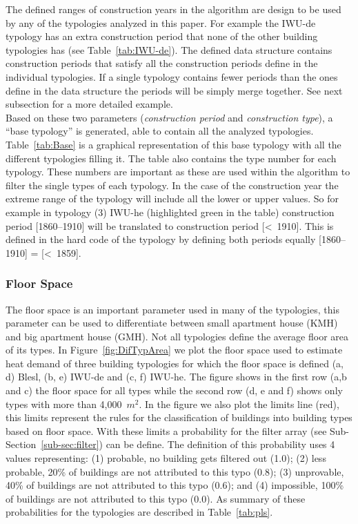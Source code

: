 \documentclass[authoryear,preprint,review,12pt]{elsarticle}
\begin{document}
\begin{linenumbers}
The defined ranges of construction years in the algorithm are design to be used
by any of the typologies analyzed in this paper.  For example the IWU-de
typology has an extra construction period that none of the other building
typologies has (see Table~\ref{tab:IWU-de}). The defined data structure
contains construction periods that satisfy all the construction periods define
in the individual typologies. If a single typology contains fewer periods than
the ones define in the data structure the periods will be simply merge
together. See next subsection for a more detailed example.\\

Based on these two parameters (\textit{construction period} and
\textit{construction type}), a ``base typology'' is generated, able to contain
all the analyzed typologies. Table~\ref{tab:Base} is a graphical
representation of this base typology with all the different typologies filling
it. The table also contains the type number for each typology. These numbers
are important as these are used within the algorithm to filter the single types
of each typology. In the case of the construction year the extreme range of
the typology will include all the lower or upper values.  So for example in
typology (3) IWU-he (highlighted green in the table) construction period
[1860--1910] will be translated to construction period [\textless~1910]. This
is defined in the hard code of the typology by defining both periods equally
[1860--1910] = [\textless~1859].\\



\subsubsection{Floor Space}\label{sub-sec:livings}

The floor space is an important parameter used in many of the typologies, this
parameter can be used to differentiate between small apartment house (KMH) and
big apartment house (GMH).  Not all typologies define the average floor area of
its types.  In Figure~\ref{fig:DifTypArea} we plot the floor space used to
estimate heat demand of three building typologies for which the floor space is
defined (a, d) Blesl, (b, e) IWU-de and (c, f) IWU-he.  The figure shows in the
first row (a,b and c) the floor space for all types while the second row (d, e
and f) shows only types with more than 4,000~$m^2$. In the figure we also plot
the limits line (red), this limits represent the rules for the classification
of buildings into building types based on floor space. With these limits a
probability for the filter array (see Sub-Section~\ref{sub-sec:filter}) can be
define.  The definition of this probability uses 4 values representing: (1)
probable, no building gets filtered out (1.0); (2) less probable, 20\% of
buildings are not attributed to this typo (0.8); (3) unprovable, 40\% of
buildings are not attributed to this typo (0.6); and (4) impossible, 100\% of
buildings are not attributed to this typo (0.0).  As summary of these
probabilities for the typologies are described in Table~\ref{tab:pls}.\\


\end{linenumbers}
\end{document}
